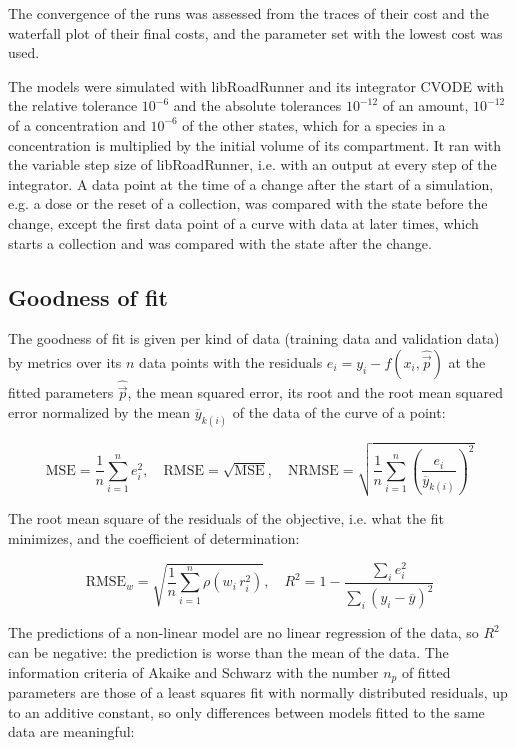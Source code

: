 \documentclass{article}
\begin{document}
The convergence of the runs was assessed from the traces of their cost and the waterfall plot of their final costs, and the parameter set with the lowest cost was used.

The models were simulated with libRoadRunner \cite{Welsh2023} and its integrator CVODE \cite{Hindmarsh2005} with the relative tolerance $10^{-6}$ and the absolute tolerances $10^{-12}$ of an amount, $10^{-12}$ of a concentration and $10^{-6}$ of the other states, which for a species in a concentration is multiplied by the initial volume of its compartment. It ran with the variable step size of libRoadRunner, i.e. with an output at every step of the integrator. A data point at the time of a change after the start of a simulation, e.g. a dose or the reset of a collection, was compared with the state before the change, except the first data point of a curve with data at later times, which starts a collection and was compared with the state after the change.

\subsection{Goodness of fit}

The goodness of fit is given per kind of data (training data and validation data) by metrics over its $n$ data points with the residuals $e_i = y_i - f(x_i, \hat{\vec{p}})$ at the fitted parameters $\hat{\vec{p}}$, the mean squared error, its root and the root mean squared error normalized by the mean $\overline{y}_{k(i)}$ of the data of the curve of a point:

\begin{equation}
\mathrm{MSE} = \frac{1}{n} \sum_{i=1}^{n} e_i^2, \quad \mathrm{RMSE} = \sqrt{\mathrm{MSE}}, \quad \mathrm{NRMSE} = \sqrt{\frac{1}{n} \sum_{i=1}^{n} \left(\frac{e_i}{\overline{y}_{k(i)}}\right)^2}
\end{equation}

The root mean square of the residuals of the objective, i.e. what the fit minimizes, and the coefficient of determination:

\begin{equation}
\mathrm{RMSE}_w = \sqrt{\frac{1}{n} \sum_{i=1}^{n} \rho\left(w_i\, r_i^2\right)}, \quad R^2 = 1 - \frac{\sum_{i} e_i^2}{\sum_{i} \left(y_i - \overline{y}\right)^2}
\end{equation}

The predictions of a non-linear model are no linear regression of the data, so $R^2$ can be negative: the prediction is worse than the mean of the data. The information criteria of Akaike \cite{Akaike1974} and Schwarz \cite{Schwarz1978} with the number $n_p$ of fitted parameters are those of a least squares fit with normally distributed residuals, up to an additive constant, so only differences between models fitted to the same data are meaningful:
\end{document}

